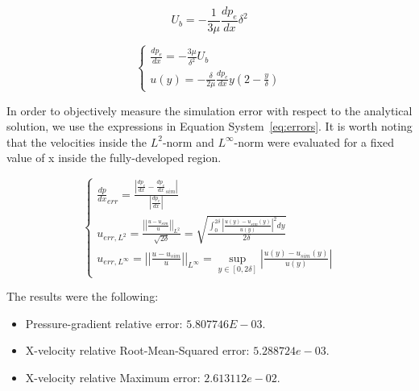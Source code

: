 \documentclass[12pt]{article}
\begin{document}
        \begin{equation} \label{eq:bulk_speed}
                U_b = - \frac{1}{3 \mu} \frac{dp_e}{dx} \delta ^ 2 
        \end{equation}

        \begin{equation} \label{eq:analytical}
                \begin{cases}
                        \frac{dp_e}{dx} = - \frac{3 \mu}{\delta ^ 2} U_b \\
                        u(y) = - \frac{\delta}{2 \mu} \frac{dp_e}{dx} y (2 - \frac{y}{\delta})
                \end{cases}
        \end{equation}

        In order to objectively measure the simulation error with respect to the analytical solution, we use the expressions in Equation System~\ref{eq:errors}. It is worth noting that the velocities inside the $ L^2 $-norm and $ L^{\infty} $-norm were evaluated for a fixed value of x inside the fully-developed region.

        \begin{equation} \label{eq:errors}
                \begin{cases}
                        \frac{dp}{dx}_{err} = \frac{\left| \frac{dp_e}{dx} - \frac{dp_e}{dx}_{sim} \right|}{\left| \frac{dp_e}{dx} \right|} \\
                        u_{err, L^2} = \frac{\left| \left| \frac{u - u_{sim}}{u} \right| \right|_{L ^ 2}}{\sqrt{2 \delta}} = \sqrt{\frac{\int_{0}^{2 \delta} \left| \frac{u(y) - u_{sim}(y)}{u(y)} \right|^2 dy}{2 \delta}} \\
                        u_{err, L^{\infty}} = \left| \left| \frac{u - u_{sim}}{u} \right| \right|_{L ^ \infty} = \sup_{y \in [0, 2 \delta]} \left| \frac{u(y) - u_{sim}(y)}{u(y)} \right|
                \end{cases}
        \end{equation}

        The results were the following:

        \begin{itemize}
                \item Pressure-gradient relative error: \( 5.807746E-03 \).
                \item X-velocity relative Root-Mean-Squared error: \( 5.288724e-03 \).
                \item X-velocity relative Maximum error: \( 2.613112e-02 \).
        \end{itemize}
\end{document}
